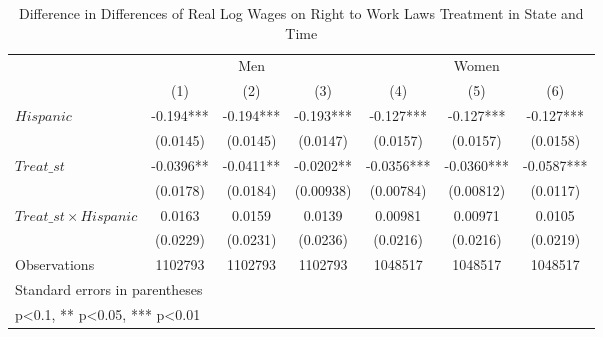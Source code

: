 \begin{table}[htbp]\centering
\def\sym#1{\ifmmode^{#1}\else\(^{#1}\)\fi}
\caption{Difference in Differences of Real Log Wages on Right to Work Laws Treatment in State and Time}
\begin{tabular}{l*{6}{c}}
\hline\hline
                    &\multicolumn{3}{c}{Men}                        &\multicolumn{3}{c}{Women}                      \\\cmidrule(lr){2-4}\cmidrule(lr){5-7}
                    &\multicolumn{1}{c}{(1)}   &\multicolumn{1}{c}{(2)}   &\multicolumn{1}{c}{(3)}   &\multicolumn{1}{c}{(4)}   &\multicolumn{1}{c}{(5)}   &\multicolumn{1}{c}{(6)}   \\
\hline
$ Hispanic $        &      -0.194***&      -0.194***&      -0.193***&      -0.127***&      -0.127***&      -0.127***\\
                    &    (0.0145)   &    (0.0145)   &    (0.0147)   &    (0.0157)   &    (0.0157)   &    (0.0158)   \\
[1em]
$ Treat\_{st} $      &     -0.0396** &     -0.0411** &     -0.0202** &     -0.0356***&     -0.0360***&     -0.0587***\\
                    &    (0.0178)   &    (0.0184)   &   (0.00938)   &   (0.00784)   &   (0.00812)   &    (0.0117)   \\
[1em]
$ Treat\_{st} \times Hispanic $&      0.0163   &      0.0159   &      0.0139   &     0.00981   &     0.00971   &      0.0105   \\
                    &    (0.0229)   &    (0.0231)   &    (0.0236)   &    (0.0216)   &    (0.0216)   &    (0.0219)   \\
\hline
Observations        &     1102793   &     1102793   &     1102793   &     1048517   &     1048517   &     1048517   \\
\hline\hline
\multicolumn{7}{l}{\footnotesize Standard errors in parentheses}\\
\multicolumn{7}{l}{\footnotesize * p<0.1, ** p<0.05, *** p<0.01}\\
\end{tabular}
\end{table}
